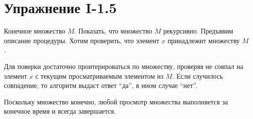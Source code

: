 \documentclass[12pt, oneside]{memoir}
\begin{document}
\section*{Упражнение I-1.5}
\begin{solution}
    {Конечное множество $M$.}
    {Показать, что множество $M$ рекурсивно.}
    {Предъявим описание процедуры.}
    Хотим проверить, что элемент $x$ принадлежит множеству $M$.

    Для поверки достаточно проитерироваться по множеству, проверяя не совпал на элемент $x$ с текущим просматриваемым элементом из $M$.
    Если случилось совпадение, то алгоритм выдаст ответ \enquote{да}, в ином случае \enquote{нет}.

    Поскольку множество конечно, любой просмотр множества выполняется за конечное время и всегда завершается.
\end{solution}
\end{document}
